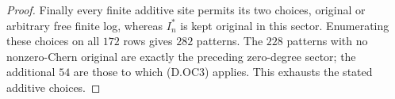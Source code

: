 \begin{proof}
Finally every finite additive site permits its two choices,
original or arbitrary free finite log, whereas $I_n^*$ is
kept original in this sector. Enumerating these choices
on all $172$ rows gives $282$ patterns. The $228$ patterns
with no nonzero-Chern original are exactly the preceding
zero-degree sector; the additional $54$ are those to which
(D.OC3) applies. This exhausts the stated additive choices.
\end{proof}

